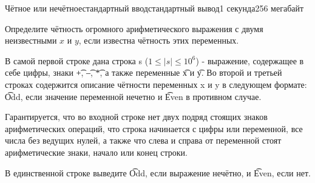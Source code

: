 \begin{problem}{Чётное или нечётное}{стандартный ввод}{стандартный вывод}{1 секунда}{256 мегабайт}

Определите чётность
огромного арифметического выражения с двумя неизвестными $x$ и $y$, 
если известна чётность этих переменных.


\InputFile
В самой первой строке дана строка s ($1 \le |s| \le 10^6$) - выражение, содержащее в себе
цифры, знаки \t{+}, \t{--}, \t{*}, а также переменные \t{x} и \t{y}.
Во второй и третьей строках содержится описание 
чётности переменных x и y в следующем формате: \t{Odd}, если
значение переменной нечетно и \t{Even} в противном случае. 

Гарантируется, что во входной строке нет двух подряд стоящих знаков арифметических операций, 
что строка начинается с цифры или переменной, все числа без ведущих нулей,  
а также что слева и справа от переменной стоят арифметические знаки, начало или конец строки. 


\OutputFile
В единственной строке выведите \t{Odd}, если выражение нечётно, и \t{Even}, если нет.


\Examples

\begin{example}
%
%
\end{example}

\end{problem}

